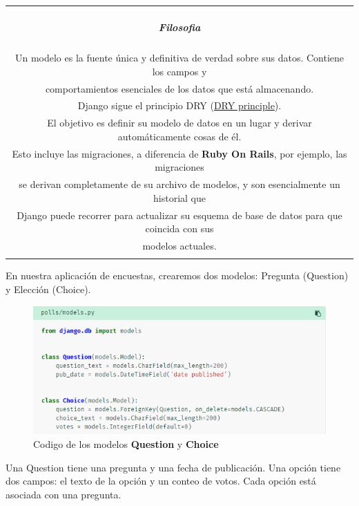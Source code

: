 \documentclass[10pt]{article}
\newcommand{\django}[1]{{\textcolor{G}{Django} #1}}
\begin{document}
\begin{table}[H]
	\begin{tabular}{||c||}
	\hline \\
	\begin{Large}
	\textbf{\textit{Filosofia}}
	\end{Large}
	\\\\		
Un modelo es la fuente única y definitiva de verdad sobre sus datos. Contiene los campos y \\comportamientos esenciales de los datos que está almacenando.\\ \django{} sigue el principio DRY ({\href{https://docs.djangoproject.com/en/3.0/misc/design-philosophies/\#dry}{\textcolor{B}{DRY principle}}}).\\ El objetivo es definir su modelo de datos en un lugar y derivar automáticamente cosas de él.\\

Esto incluye las migraciones, a diferencia de \textbf{Ruby On Rails}, por ejemplo, las migraciones\\ se derivan completamente de su archivo de modelos, y son esencialmente un historial que\\ \django{} puede recorrer para actualizar su esquema de base de datos para que coincida con sus\\ modelos actuales.
\\\\ \hline 	
			\end{tabular}
		\end{table}		

En nuestra aplicación de encuestas, crearemos dos modelos: Pregunta (Question) y Elección (Choice). 

\begin{figure}[H]
	\begin{center}
		\includegraphics[scale=0.7]{figuras/3/32/322/img1.png}
		\renewcommand{\arraystretch}{1.3}
		\caption{Codigo de los modelos \textbf{Question} y \textbf{Choice}}
	\end{center}
\end{figure}
Una Question tiene una pregunta y una fecha de publicación. Una opción tiene dos campos: el texto de la opción y un conteo de votos. Cada opción está asociada con una pregunta.
\end{document}
